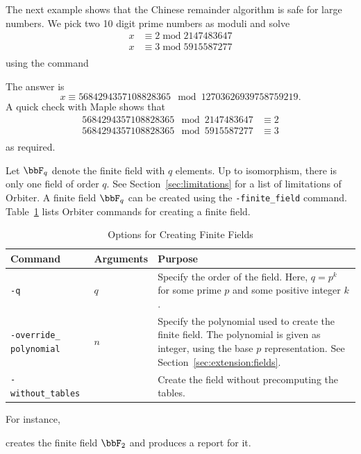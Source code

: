 \bigskip

The next example shows that the Chinese remainder algorithm is safe for large numbers.
We pick two 10 digit prime numbers as moduli and solve 
\begin{eqnarray*}
x & \equiv 2 \; \mbox{mod} \; 2147483647\\
x & \equiv 3 \; \mbox{mod} \; 5915587277\\
\end{eqnarray*}
using the command
{\tt

}
The answer is 
$$
x \equiv 5684294357108828365 \mod 12703626939758759219.
$$
A quick check with Maple shows that 
\begin{eqnarray*}
5684294357108828365 \mod 2147483647 & \equiv 2 \\
5684294357108828365 \mod 5915587277 & \equiv 3 \\
\end{eqnarray*}
as required.



Let $\bbF_q$ denote the finite field with $q$ elements. 
Up to isomorphism, there is only one field of order $q$. 
See Section~\ref{sec:limitations} for a list of limitations of Orbiter.
A finite field $\bbF_q$ can be created using the 
\verb'-finite_field'
command.
Table~\ref{tab:finitefield:create} lists Orbiter commands for creating a finite field.
\begin{table}
	\begin{center}
	\begin{tabular}{|p{4cm}|p{3cm}|p{7cm}|}
		\hline
		Command & Arguments & Purpose \\
		\hline
		\hline
		\verb'-q' & $q$ &  Specify the order of the field. Here, $q=p^k$  for some prime $p$ and some positive integer $k$. \\
		\hline
		\verb'-override_' \verb'polynomial' & $n$  &  Specify the polynomial used to create the finite field. 
		The polynomial is given as integer, using the base $p$ representation. See Section~\ref{sec:extension:fields}. \\
		\hline
		\verb'-without_tables' &  &  Create the field without precomputing the tables.  \\
		\hline
		\end{tabular}
	\end{center}
	\caption{\label{tab:finitefield:create}Options for Creating Finite Fields}
	\end{table}
For instance,  
{\tt

}
creates the finite field $\bbF_2$ and produces a report for it.


